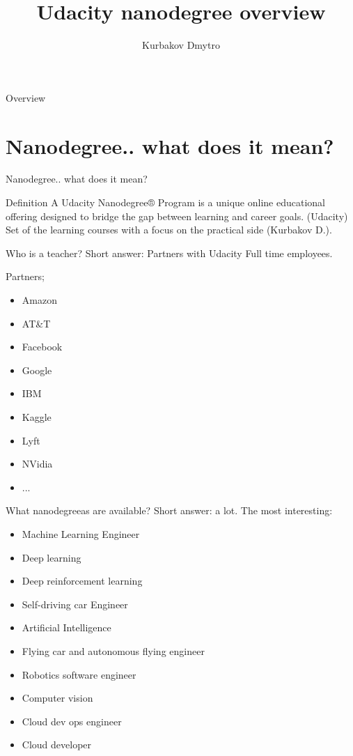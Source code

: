\documentclass{beamer}
\title{Udacity nanodegree overview}
\author{Kurbakov Dmytro}
\begin{document}
\begin{frame}
\titlepage
\end{frame}

\begin{frame}{Overview}
\tableofcontents
\end{frame}


\section{Nanodegree.. what does it mean?}

\begin{frame}
\begin{center}
\Huge Nanodegree.. what does it mean?
\end{center}
\end{frame}

\begin{frame}[fragile]{Definition}
A Udacity Nanodegree® Program is a unique online educational offering designed to bridge the gap between learning and career goals. (Udacity)
\newline
\newline
Set of the learning courses with a focus on the practical side (Kurbakov D.). 

\end{frame}

\begin{frame}[fragile]{Who is a teacher?}
Short answer: Partners with Udacity Full time employees.

Partners;
\begin{itemize}
\item Amazon
\item AT\&T
\item Facebook
\item Google
\item IBM
\item Kaggle
\item Lyft
\item NVidia
\item ...
\end{itemize}
\end{frame}

\begin{frame}{What nanodegreeas are available?}
Short answer: a lot.
\vfill
The most interesting:
\begin{itemize}
\item Machine Learning Engineer
\item Deep learning
\item Deep reinforcement learning
\item Self-driving car Engineer
\item Artificial Intelligence
\item Flying car and autonomous flying engineer
\item Robotics software engineer
\item Computer vision
\item Cloud dev ops engineer
\item Cloud developer
\end{itemize}
\end{frame}
\end{document}
